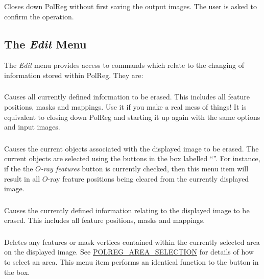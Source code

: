 \subsubsection {} Closes down PolReg without first saving the output
images. The user is asked to confirm the operation.

\subsection {The {\em Edit} Menu}
The {\em Edit} menu provides access to commands which relate to
the changing of information stored within PolReg. They are:

\subsubsection {} Causes all currently defined information to be
erased. This includes all feature positions, masks and mappings. Use it
if you make a real mess of things! It is equivalent to closing down PolReg 
and starting it up again with the same options and input images.

\subsubsection {} Causes the
current objects associated with the displayed image to be erased. The
current objects are selected using the buttons in the box labelled
``''. For instance, if the the
{\em $O$-ray features} button is currently checked, then this menu item
will result in all $O$-ray feature positions being cleared from the
currently displayed image.

\subsubsection {} Causes the
currently defined information relating to the displayed image to be
erased. This includes all feature positions, masks and mappings.

\subsubsection {} Deletes any features
or mask vertices contained within the currently selected area on the
displayed image. See \hyperref{here}{section }{}{POLREG_AREA_SELECTION}
for details of how to select an area. This menu item performs an
identical function to the  button in
the  box.

